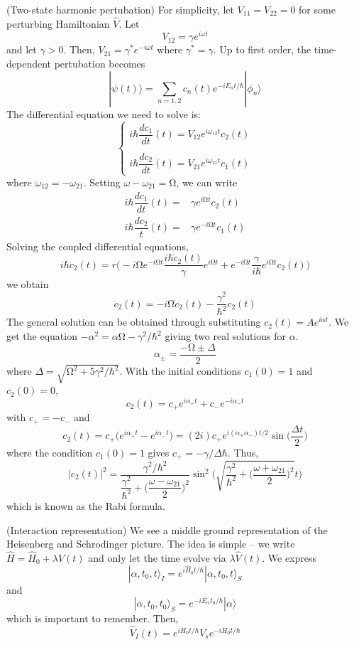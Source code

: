 \begin{ex}
(Two-state harmonic pertubation) For simplicity, let $V_{11}=V_{22}=0$ for some perturbing Hamiltonian $\hat{V}$. Let
\[V_{12}=\gamma e^{i\omega t}\]
and let $\gamma >0$. Then, $V_{21}=\gamma ^{*}e^{-i\omega t}$ where $\gamma ^{*}=\gamma $. Up to first order, the time-dependent pertubation becomes
\[|\psi (t)\rangle =\sum _{n=1,2}c_{n}(t)e^{-iE_{n}t/\hbar }|\phi_{n} \rangle \]
The differential equation we need to solve is:
\[\begin{cases}
i\hbar \dfrac{d c_{1}}{d t}(t)=V_{12}e^{i\omega _{12}t}c_{2}(t)\\\\
i\hbar \dfrac{d c_{2}}{d t}(t)=V_{21}e^{i\omega _{21}t}c_{1}(t)
\end{cases}\]
where $\omega _{12}=-\omega _{21}$. Setting $\omega -\omega _{21}=\mathrm{\Omega} $, we can write
\[\begin{align*}
i\hbar \dfrac{d c_{1}}{dt }(t)=&\gamma e^{i\mathrm{\Omega} t}c_{2}(t)\\
i\hbar \dfrac{dc_{2}}{t}(t)=&\gamma e^{-i\mathrm{\Omega} t}c_1(t)
\end{align*}\]
Solving the coupled differential equations,
\[i\hbar \ddot{c}_{2}(t)=r\Big(-i\mathrm{\Omega} e^{-i\mathrm{\Omega} t}\dfrac{i\hbar \dot{c}_{2}(t)}{\gamma }e^{i\mathrm{\Omega} t}+e^{-i\mathrm{\Omega} t}\dfrac{\gamma }{i\hbar }e^{i\mathrm{\Omega} t}c_2(t)\Big)\]
we obtain
\[\ddot{c}_{2}(t)=-i\mathrm{\Omega} \dot{c}_{2}(t)-\dfrac{\gamma ^2}{\hbar ^2}c_{2}(t)\]
The general solution can be obtained through substituting $c_2(t)=Ae^{i\alpha t}$. We get the equation $-\alpha ^2=\alpha \mathrm{\Omega} -\gamma ^2/\hbar ^2$ giving two real solutions for $\alpha $.
\[\alpha _{\pm}=\dfrac{-\mathrm{\Omega} \pm \Delta }{2}\]
where $\Delta =\sqrt{\mathrm{\Omega} ^2+5\gamma ^2/\hbar ^2}$. With the initial conditions $c_1(0)=1$ and $c_2(0)=0$,
\[c_2(t)=c_{+}e^{i\alpha _{+}t}+c_{-}e^{-i\alpha _{-}t}\]
with $c_{+}=-c_{-}$ and
\[c_2(t)=c_{+}\Big(e^{i\alpha _{+}t}-e^{i\alpha _{-}t}\Big)=(2i)c_{+}e^{i(\alpha _{+}\alpha _{-})t/2}\sin \Big(\dfrac{\Delta t}{2}\Big)\]
where the condition $c_{1}(0)=1$ gives $c_{+}=-\gamma /\Delta \hbar $. Thus,
\[|c_2(t)|^2=\dfrac{\gamma ^2/\hbar ^2}{\dfrac{\gamma ^2}{\hbar ^2}+\Big(\dfrac{\omega -\omega _{21}}{2}\Big)^2}\sin ^2\Big(\sqrt{\dfrac{\gamma ^2}{\hbar ^2}+\Big(\dfrac{\omega +\omega _{21}}{2}\Big)^2}t\Big)\]
which is known as the Rabi formula.
\end{ex}
\vspace{2ex}
\begin{defi}
(Interaction representation) We see a middle ground representation of the Heisenberg and Schrodinger picture. The idea is simple -- we write $\hat{H}=\hat{H}_{0}+\lambda \hat{V}(t)$ and only let the time evolve via $\lambda \hat{V}(t)$.  We express
\[|\alpha ,t_{0},t\rangle _{I}=e^{i\hat{H}_{0}t/\hbar }|\alpha ,t_0,t\rangle _{S}\]
and
\[|\alpha ,t_0,t_0\rangle _{S}=e^{-iE_{\alpha }t_0/\hbar }|\alpha \rangle \]
which is important to remember. Then,
\[\hat{V}_{I}(t)=e^{iH_0t/\hbar }V_{s}e^{-iH_0t/\hbar }\]

\end{defi}
\vspace{2ex}

